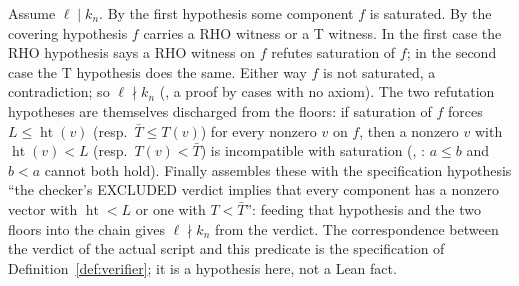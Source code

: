 Assume $\ell\mid k_n$. By the first hypothesis some component $f$ is saturated. By the covering hypothesis $f$ carries a RHO witness or a T witness. In the first case the RHO hypothesis says a RHO witness on $f$ refutes saturation of $f$; in the second case the T hypothesis does the same. Either way $f$ is not saturated, a contradiction; so $\ell\nmid k_n$ (, a proof by cases with no axiom). The two refutation hypotheses are themselves discharged from the floors: if saturation of $f$ forces $L\le\operatorname{ht}(v)$ (resp.\ $\bar T\le T(v)$) for every nonzero $v$ on $f$, then a nonzero $v$ with $\operatorname{ht}(v)<L$ (resp.\ $T(v)<\bar T$) is incompatible with saturation (, : $a\le b$ and $b<a$ cannot both hold). Finally  assembles these with the specification hypothesis ``the checker's EXCLUDED verdict implies that every component has a nonzero vector with $\operatorname{ht}<L$ or one with $T<\bar T$'': feeding that hypothesis and the two floors into the chain gives $\ell\nmid k_n$ from the verdict. The correspondence between the verdict of the actual script and this predicate is the specification of Definition~\ref{def:verifier}; it is a hypothesis here, not a Lean fact.
